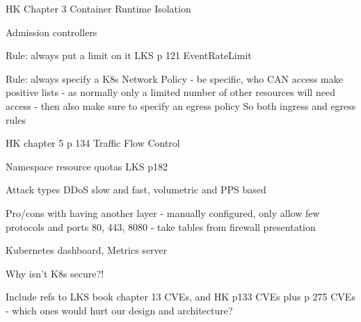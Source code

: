 \documentclass[Screen16to9,17pt]{foils}
\begin{document}
\begin{list2}
\item HK Chapter 3 Container Runtime Isolation
\end{list2}



\begin{list2}
\item Admission controllers
\end{list2}

Rule: always put a limit on it
LKS p 121 EventRateLimit


Rule: always specify a K8s Network Policy - be specific, who CAN access
make positive lists - as normally only a limited number of other resources will need access
- then also make sure to specify an egress policy
So both ingress and egress rules

HK chapter 5 p 134 Traffic Flow Control


Namespace resource quotas LKS p182


\begin{list2}
\item Attack types DDoS slow and fast, volumetric and PPS based
\item Pro/cons with having another layer - manually configured, only allow few protocols and ports 80, 443, 8080
- take tables from firewall presentation
\end{list2}




\begin{list2}
\item
\end{list2}


\begin{list2}
\item Kubernetes dashboard, Metrics server
\end{list2}


Why isn't K8s secure?!
\begin{list2}
\item Include refs to LKS book chapter 13 CVEs, and HK p133 CVEs plus p 275 CVEs
- which ones would hurt our design and architecture?
\end{list2}
\end{document}

